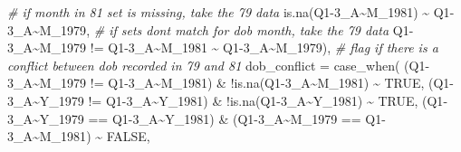 \documentclass[12pt]{article}
\newenvironment{Shaded}{\begin{snugshade}}{\end{snugshade}}
\newcommand{\AttributeTok}[1]{\textcolor[rgb]{0.77,0.63,0.00}{#1}}
\newcommand{\CommentTok}[1]{\textcolor[rgb]{0.56,0.35,0.01}{\textit{#1}}}
\newcommand{\ConstantTok}[1]{\textcolor[rgb]{0.00,0.00,0.00}{#1}}
\newcommand{\FunctionTok}[1]{\textcolor[rgb]{0.00,0.00,0.00}{#1}}
\newcommand{\NormalTok}[1]{#1}
\newcommand{\SpecialCharTok}[1]{\textcolor[rgb]{0.00,0.00,0.00}{#1}}
\newcommand{\StringTok}[1]{\textcolor[rgb]{0.31,0.60,0.02}{#1}}
\begin{document}
\begin{Shaded}
\begin{Highlighting}[]
      \CommentTok{\# if month in 81 set is missing, take the 79 data}
      \FunctionTok{is.na}\NormalTok{(}\StringTok{\textasciigrave{}}\AttributeTok{Q1{-}3\_A\textasciitilde{}M\_1981}\StringTok{\textasciigrave{}}\NormalTok{) }\SpecialCharTok{\textasciitilde{}} \StringTok{\textasciigrave{}}\AttributeTok{Q1{-}3\_A\textasciitilde{}M\_1979}\StringTok{\textasciigrave{}}\NormalTok{,}
      \CommentTok{\# if sets don\textquotesingle{}t match for dob month, take the 79 data}
      \StringTok{\textasciigrave{}}\AttributeTok{Q1{-}3\_A\textasciitilde{}M\_1979}\StringTok{\textasciigrave{}} \SpecialCharTok{!=} \StringTok{\textasciigrave{}}\AttributeTok{Q1{-}3\_A\textasciitilde{}M\_1981}\StringTok{\textasciigrave{}} \SpecialCharTok{\textasciitilde{}} \StringTok{\textasciigrave{}}\AttributeTok{Q1{-}3\_A\textasciitilde{}M\_1979}\StringTok{\textasciigrave{}}\NormalTok{),}
    \CommentTok{\# flag if there is a conflict between dob recorded in 79 and 81}
    \AttributeTok{dob\_conflict =} \FunctionTok{case\_when}\NormalTok{(}
\NormalTok{      (}\StringTok{\textasciigrave{}}\AttributeTok{Q1{-}3\_A\textasciitilde{}M\_1979}\StringTok{\textasciigrave{}} \SpecialCharTok{!=} \StringTok{\textasciigrave{}}\AttributeTok{Q1{-}3\_A\textasciitilde{}M\_1981}\StringTok{\textasciigrave{}}\NormalTok{) }\SpecialCharTok{\&} \SpecialCharTok{!}\FunctionTok{is.na}\NormalTok{(}\StringTok{\textasciigrave{}}\AttributeTok{Q1{-}3\_A\textasciitilde{}M\_1981}\StringTok{\textasciigrave{}}\NormalTok{)}
      \SpecialCharTok{\textasciitilde{}} \ConstantTok{TRUE}\NormalTok{,}
\NormalTok{      (}\StringTok{\textasciigrave{}}\AttributeTok{Q1{-}3\_A\textasciitilde{}Y\_1979}\StringTok{\textasciigrave{}} \SpecialCharTok{!=} \StringTok{\textasciigrave{}}\AttributeTok{Q1{-}3\_A\textasciitilde{}Y\_1981}\StringTok{\textasciigrave{}}\NormalTok{) }\SpecialCharTok{\&} \SpecialCharTok{!}\FunctionTok{is.na}\NormalTok{(}\StringTok{\textasciigrave{}}\AttributeTok{Q1{-}3\_A\textasciitilde{}Y\_1981}\StringTok{\textasciigrave{}}\NormalTok{)}
      \SpecialCharTok{\textasciitilde{}} \ConstantTok{TRUE}\NormalTok{,}
\NormalTok{      (}\StringTok{\textasciigrave{}}\AttributeTok{Q1{-}3\_A\textasciitilde{}Y\_1979}\StringTok{\textasciigrave{}} \SpecialCharTok{==} \StringTok{\textasciigrave{}}\AttributeTok{Q1{-}3\_A\textasciitilde{}Y\_1981}\StringTok{\textasciigrave{}}\NormalTok{) }\SpecialCharTok{\&}
\NormalTok{        (}\StringTok{\textasciigrave{}}\AttributeTok{Q1{-}3\_A\textasciitilde{}M\_1979}\StringTok{\textasciigrave{}} \SpecialCharTok{==} \StringTok{\textasciigrave{}}\AttributeTok{Q1{-}3\_A\textasciitilde{}M\_1981}\StringTok{\textasciigrave{}}\NormalTok{) }\SpecialCharTok{\textasciitilde{}} \ConstantTok{FALSE}\NormalTok{,}

\end{Highlighting}
\end{Shaded}
\end{document}
